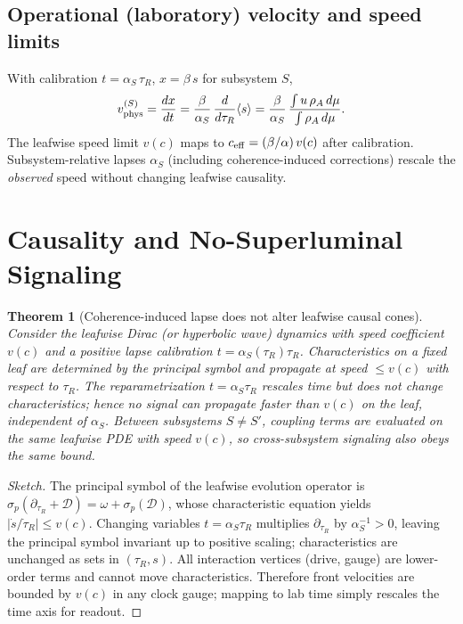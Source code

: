 \documentclass[11pt]{article}
\newtheorem{theorem}{Theorem}
\begin{document}
\subsection{Operational (laboratory) velocity and speed limits}
With calibration $t=\alpha_S\,\tau_R$, $x=\beta\,s$ for subsystem $S$,
\begin{equation}
v_{\rm phys}^{(S)} = \frac{dx}{dt}=\frac{\beta}{\alpha_S}\,\frac{d}{d\tau_R}\langle s\rangle
=\frac{\beta}{\alpha_S}\,\frac{\int u\,\rho_A\, d\mu}{\int \rho_A\, d\mu}.
\end{equation}
The leafwise speed limit $v(c)$ maps to $c_{\rm eff}=(\beta/\alpha)\,v(c)$ after calibration.
Subsystem-relative lapses $\alpha_S$ (including coherence-induced corrections) rescale the \emph{observed} speed without changing leafwise causality.

\section{Causality and No-Superluminal Signaling}
\label{sec:causality_proof}

\begin{theorem}[Coherence-induced lapse does not alter leafwise causal cones]
Consider the leafwise Dirac (or hyperbolic wave) dynamics with speed coefficient \(v(c)\) and a positive lapse calibration \(t=\alpha_S(\tau_R)\tau_R\). 
Characteristics on a fixed leaf are determined by the principal symbol and propagate at speed \(\le v(c)\) with respect to \(\tau_R\).
The reparametrization \(t=\alpha_S\tau_R\) rescales time but does not change characteristics; hence no signal can propagate faster than \(v(c)\) on the leaf, independent of \(\alpha_S\). 
Between subsystems \(S\neq S'\), coupling terms are evaluated on the same leafwise PDE with speed \(v(c)\), so cross-subsystem signaling also obeys the same bound.
\end{theorem}

\begin{proof}[Sketch]
The principal symbol of the leafwise evolution operator is \(\sigma_p(\partial_{\tau_R} + \mathcal D)=\omega + \sigma_p(\mathcal D)\), whose characteristic equation yields \(|\dot s/\dot \tau_R|\le v(c)\).
Changing variables \(t=\alpha_S \tau_R\) multiplies \(\partial_{\tau_R}\) by \(\alpha_S^{-1}>0\), leaving the principal symbol invariant up to positive scaling; characteristics are unchanged as sets in \((\tau_R,s)\).
All interaction vertices (drive, gauge) are lower-order terms and cannot move characteristics. 
Therefore front velocities are bounded by \(v(c)\) in any clock gauge; mapping to lab time simply rescales the time axis for readout.
\end{proof}
\end{document}
